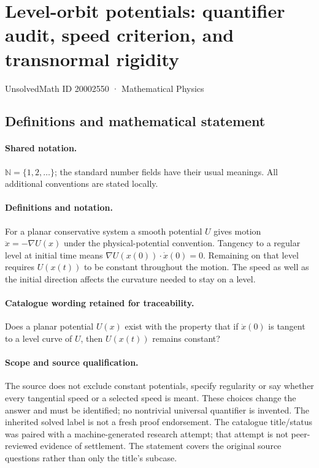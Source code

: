 \documentclass[11pt]{article}
\begin{document}
\setcounter{section}{20002549}
\section{Level-orbit potentials: quantifier audit, speed criterion, and transnormal rigidity}\label{20002550}
{\small UnsolvedMath ID 20002550 · Mathematical Physics}
\subsection{Definitions and mathematical statement}

\paragraph{Shared notation.}$\mathbb N=\{1,2,\ldots\}$; the standard number fields have their usual meanings. All additional conventions are stated locally.


\paragraph{Definitions and notation.}For a planar conservative system a smooth potential $U$ gives motion $\ddot x=-\nabla U(x)$ under the physical-potential convention. Tangency to a regular level at initial time means $\nabla U(x(0))\cdot\dot x(0)=0$. Remaining on that level requires $U(x(t))$ to be constant throughout the motion. The speed as well as the initial direction affects the curvature needed to stay on a level.

\paragraph{Catalogue wording retained for traceability.}
Does a planar potential $U(x)$ exist with the property that if $\dot x(0)$ is tangent to a level curve of $U$, then $U(x(t))$ remains constant?
\paragraph{Scope and source qualification.}The source does not exclude constant potentials, specify regularity or say whether every tangential speed or a selected speed is meant. These choices change the answer and must be identified; no nontrivial universal quantifier is invented. The inherited solved label is not a fresh proof endorsement. The catalogue title/status was paired with a machine-generated research attempt; that attempt is not peer-reviewed evidence of settlement. The statement covers the original source questions rather than only the title’s subcase.
\end{document}
